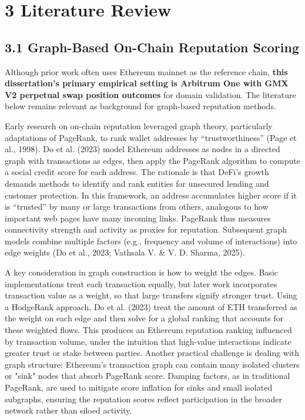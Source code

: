 \clearpage
{}
\section*{3 \textbf{Literature Review}}
\label{sec:literature-review}

\subsection*{3.1 Graph-Based On-Chain Reputation Scoring}
\label{sec:graph-based-on-chain-reputation-scoring}

Although prior work often uses Ethereum mainnet as the reference chain, \textbf{this dissertation's primary empirical setting is Arbitrum One with GMX V2 perpetual swap position outcomes} for domain validation. The literature below remains relevant as background for graph-based reputation methods.

Early research on on-chain reputation leveraged graph theory, particularly adaptations of PageRank, to rank wallet addresses by ``trustworthiness'' (Page et al., 1998). Do et al. (2023) model Ethereum addresses as nodes in a directed graph with transactions as edges, then apply the PageRank algorithm to compute a social credit score for each address. The rationale is that DeFi's growth demands methods to identify and rank entities for unsecured lending and customer protection. In this framework, an address accumulates higher score if it is ``trusted'' by many or large transactions from others, analogous to how important web pages have many incoming links. PageRank thus measures connectivity strength and activity as proxies for reputation. Subsequent graph models combine multiple factors (e.g., frequency and volume of interactions) into edge weights (Do et al., 2023; Vathsala V. \& V. D. Sharma, 2025).


A key consideration in graph construction is how to weight the edges. Basic implementations treat each transaction equally, but later work incorporates transaction value as a weight, so that large transfers signify stronger trust. Using a HodgeRank approach, Do et al. (2023) treat the amount of ETH transferred as the weight on each edge and then solve for a global ranking that accounts for these weighted flows. This produces an Ethereum reputation ranking influenced by transaction volume, under the intuition that high-value interactions indicate greater trust or stake between parties. Another practical challenge is dealing with graph structure: Ethereum's transaction graph can contain many isolated clusters or "sink" nodes that absorb PageRank score. Damping factors, as in traditional PageRank, are used to mitigate score inflation for sinks and small isolated subgraphs, ensuring the reputation scores reflect participation in the broader network rather than siloed activity.


